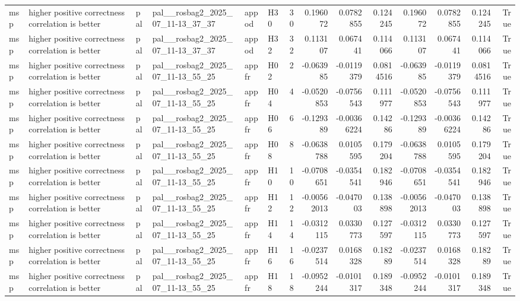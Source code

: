 \begin{longtable}{llllllrrrrrrrr}
msp & higher positive correctness correlation is better & pal & pal\_\_rosbag2\_2025\_07\_11-13\_37\_37 & appod & H30 & 30 & 0.196072 & 0.0782855 & 0.124245 & 0.196072 & 0.0782855 & 0.124245 & True \\
msp & higher positive correctness correlation is better & pal & pal\_\_rosbag2\_2025\_07\_11-13\_37\_37 & appod & H32 & 32 & 0.113107 & 0.067441 & 0.114066 & 0.113107 & 0.067441 & 0.114066 & True \\
msp & higher positive correctness correlation is better & pal & pal\_\_rosbag2\_2025\_07\_11-13\_55\_25 & appfr & H02 & 2 & -0.063985 & -0.0119379 & 0.0814516 & -0.063985 & -0.0119379 & 0.0814516 & True \\
msp & higher positive correctness correlation is better & pal & pal\_\_rosbag2\_2025\_07\_11-13\_55\_25 & appfr & H04 & 4 & -0.0520853 & -0.0756543 & 0.111977 & -0.0520853 & -0.0756543 & 0.111977 & True \\
msp & higher positive correctness correlation is better & pal & pal\_\_rosbag2\_2025\_07\_11-13\_55\_25 & appfr & H06 & 6 & -0.129389 & -0.00366224 & 0.14286 & -0.129389 & -0.00366224 & 0.14286 & True \\
msp & higher positive correctness correlation is better & pal & pal\_\_rosbag2\_2025\_07\_11-13\_55\_25 & appfr & H08 & 8 & -0.0638788 & 0.0105595 & 0.179204 & -0.0638788 & 0.0105595 & 0.179204 & True \\
msp & higher positive correctness correlation is better & pal & pal\_\_rosbag2\_2025\_07\_11-13\_55\_25 & appfr & H10 & 10 & -0.0708651 & -0.0354541 & 0.182946 & -0.0708651 & -0.0354541 & 0.182946 & True \\
msp & higher positive correctness correlation is better & pal & pal\_\_rosbag2\_2025\_07\_11-13\_55\_25 & appfr & H12 & 12 & -0.00562013 & -0.047003 & 0.138898 & -0.00562013 & -0.047003 & 0.138898 & True \\
msp & higher positive correctness correlation is better & pal & pal\_\_rosbag2\_2025\_07\_11-13\_55\_25 & appfr & H14 & 14 & -0.0312115 & 0.0330773 & 0.127597 & -0.0312115 & 0.0330773 & 0.127597 & True \\
msp & higher positive correctness correlation is better & pal & pal\_\_rosbag2\_2025\_07\_11-13\_55\_25 & appfr & H16 & 16 & -0.0237514 & 0.0168328 & 0.18289 & -0.0237514 & 0.0168328 & 0.18289 & True \\
msp & higher positive correctness correlation is better & pal & pal\_\_rosbag2\_2025\_07\_11-13\_55\_25 & appfr & H18 & 18 & -0.0952244 & -0.0101317 & 0.189348 & -0.0952244 & -0.0101317 & 0.189348 & True \\

\end{longtable}
